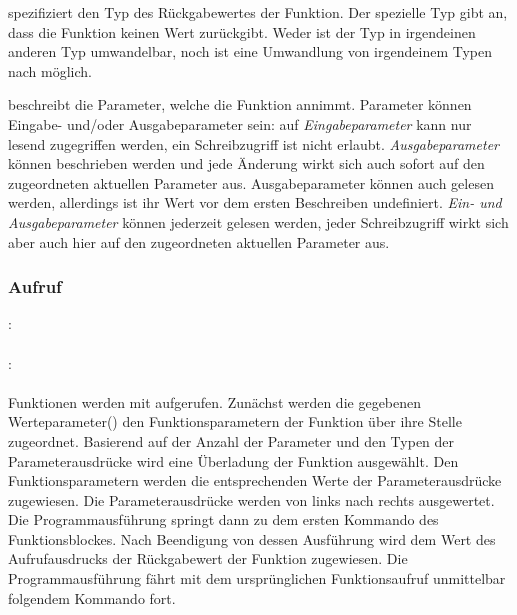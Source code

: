  spezifiziert den Typ des Rückgabewertes der Funktion. Der spezielle Typ 
gibt an, dass die Funktion keinen Wert zurückgibt.
Weder ist der Typ  in irgendeinen anderen Typ umwandelbar, noch ist eine Umwandlung
von irgendeinem Typen nach  möglich.

 beschreibt die Parameter, welche die Funktion annimmt.
Parameter können Eingabe- und/oder Ausgabeparameter sein: auf \emph{Eingabeparameter} kann
nur lesend zugegriffen werden, ein Schreibzugriff ist nicht erlaubt.
\emph{Ausgabeparameter} können beschrieben werden und jede Änderung wirkt sich auch sofort auf
den zugeordneten aktuellen Parameter aus. Ausgabeparameter können auch gelesen werden,
allerdings ist ihr Wert vor dem ersten Beschreiben undefiniert.
\emph{Ein- und Ausgabeparameter} können jederzeit gelesen werden, jeder Schreibzugriff wirkt sich
aber auch hier auf den zugeordneten aktuellen Parameter aus.



\subsubsection{Aufruf}\label{Aufruf}
:\label{funktion_aufruf}\\
\hspace*{1cm} \Gspace\Gt{(}\Gspace{}\Gspace\Gt{)}\\
:\label{funktion_param_aktuell}\\
\hspace*{1cm} \Gspace{}\\

Funktionen werden mit  aufgerufen. Zunächst werden die
gegebenen Werteparameter() den Funktionsparametern der Funktion über ihre Stelle zugeordnet.
Basierend auf der Anzahl der Parameter und den Typen der Parameterausdrücke wird eine Überladung der Funktion ausgewählt.
Den Funktionsparametern werden die entsprechenden Werte der Parameterausdrücke zugewiesen.
Die Parameterausdrücke werden von links nach rechts ausgewertet.
Die Programmausführung springt dann zu dem ersten
Kommando des Funktionsblockes. Nach Beendigung von dessen Ausführung wird dem Wert des Aufrufausdrucks der
Rückgabewert der Funktion zugewiesen. Die Programmausführung fährt mit dem ursprünglichen Funktionsaufruf
unmittelbar folgendem Kommando fort.

